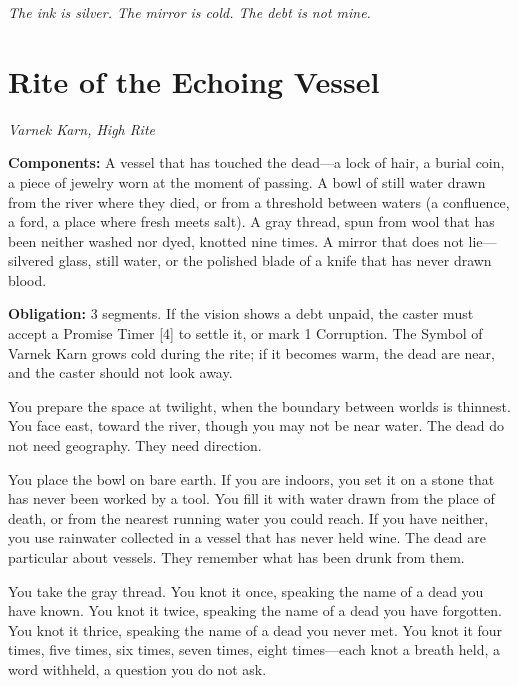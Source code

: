 \begin{center}
\emph{The ink is silver. The mirror is cold. The debt is not mine.}
\end{center}

\vspace{1em}

\section*{Rite of the Echoing Vessel}
\emph{Varnek Karn, High Rite}

\begin{ritualbox}
\textbf{Components:} A vessel that has touched the dead---a lock of hair, a burial coin, a piece of jewelry worn at the moment of passing. A bowl of still water drawn from the river where they died, or from a threshold between waters (a confluence, a ford, a place where fresh meets salt). A gray thread, spun from wool that has been neither washed nor dyed, knotted nine times. A mirror that does not lie---silvered glass, still water, or the polished blade of a knife that has never drawn blood.

\medskip
\textbf{Obligation:} 3 segments. If the vision shows a debt unpaid, the caster must accept a Promise Timer [4] to settle it, or mark 1 Corruption. The Symbol of Varnek Karn grows cold during the rite; if it becomes warm, the dead are near, and the caster should not look away.
\end{ritualbox}

\vspace{1em}

You prepare the space at twilight, when the boundary between worlds is thinnest. You face east, toward the river, though you may not be near water. The dead do not need geography. They need direction.

You place the bowl on bare earth. If you are indoors, you set it on a stone that has never been worked by a tool. You fill it with water drawn from the place of death, or from the nearest running water you could reach. If you have neither, you use rainwater collected in a vessel that has never held wine. The dead are particular about vessels. They remember what has been drunk from them.

You take the gray thread. You knot it once, speaking the name of a dead you have known. You knot it twice, speaking the name of a dead you have forgotten. You knot it thrice, speaking the name of a dead you never met. You knot it four times, five times, six times, seven times, eight times---each knot a breath held, a word withheld, a question you do not ask.

